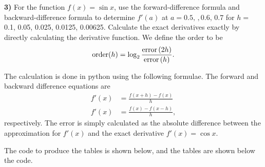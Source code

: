 \documentclass[12pt,a4paper]{article}
\newcommand{\prob}[2]{\textbf{#1)} #2}
\begin{document}
\prob{3}{
    For the function $f(x) = \sin{x}$, use the forward-difference formula and backward-difference formula to determine $f'(a)$ at $a = 0.5,\,,0.6,\,0.7$ for $h =$ 0.1, 0.05, 0.025, 0.0125, 0.00625.
    Calculate the exact derivatives exactly by directly calculating the derivative function.
    We define the order to be
    \begin{align*}
        {\rm order}(h) = \log_2{\frac{{\rm error}\left( 2h \right)}{{\rm error}\left( h \right)}}
    .\end{align*}
}

The calculation is done in python using the following formulae.
The forward and backward difference equations are 
\begin{align*}
f'(x) &= \frac{f(x + h) - f(x)}{h} \\
f'(x) &= \frac{f(x) - f(x - h)}{h}
,\end{align*}
respectively.
The error is simply calculated as the absolute difference between the approximation for $f'(x)$ and the exact derivative $f'(x) = \cos{x}$.

The code to produce the tables is shown below, and the tables are shown below the code.





\end{document}
